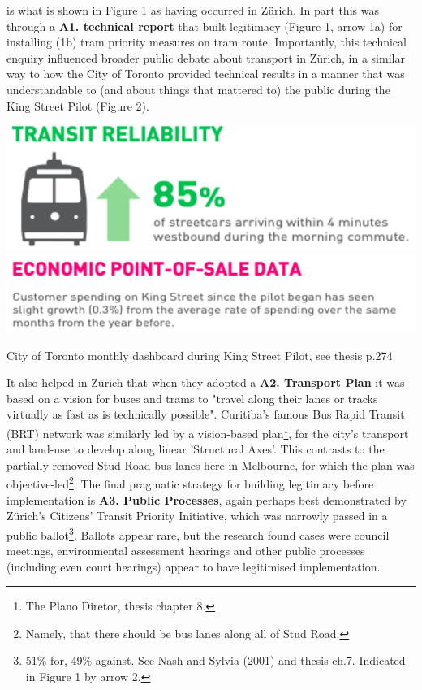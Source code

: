 \documentclass{tufte-handout}
\begin{document}
 is what is shown in Figure 1 as having occurred in Zürich. In part this was through a \textbf{A1. technical report} that built legitimacy (Figure 1, arrow 1a) for installing (1b) tram priority measures on tram route. Importantly, this technical enquiry influenced broader public debate about transport in Zürich, in a similar way to how the City of Toronto provided technical results in a manner that was understandable to (and about things that mattered to) the public during the King Street Pilot (Figure 2). 
\begin{marginfigure}%
  \includegraphics[width=\linewidth]{Toronto_dashboard_1}
   \includegraphics[width=\linewidth]{Toronto_dashboard_4}
  \caption{City of Toronto monthly dashboard during King Street Pilot, see thesis p.274}
  \label{fig:Toronto_dashboard}
\end{marginfigure}
It also helped in Zürich that when they adopted a \textbf{A2. Transport Plan} it was based on a vision for buses and trams to "travel along their lanes or tracks virtually as fast as is technically possible"\citep{Nash:2001ab}. Curitiba's famous Bus Rapid Transit (BRT) network was similarly led by a vision-based plan\footnote{The Plano Diretor, thesis chapter 8.}, for the city's transport and land-use to develop along linear 'Structural Axes'. This contrasts to the partially-removed Stud Road bus lanes here in Melbourne, for which the plan was objective-led\footnote{Namely, that there should be bus lanes along all of Stud Road.}.
The final pragmatic strategy for building legitimacy before implementation is \textbf{A3. Public Processes}, again perhaps best demonstrated by Zürich's Citizens' Transit Priority Initiative, which was narrowly passed in a public ballot\footnote{51\% for, 49\% against.  See Nash and Sylvia (2001) and thesis ch.7. Indicated in Figure 1 by arrow 2.}. Ballots appear rare, but the research found cases were council meetings, environmental assessment hearings and other public processes (including even court hearings) appear to have legitimised implementation.  
\end{document}
